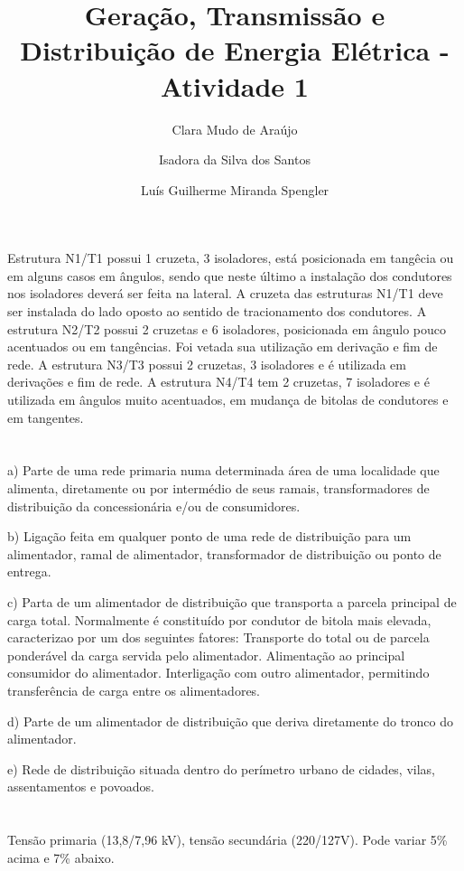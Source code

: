 \documentclass{article}
\title{Geração, Transmissão e Distribuição de Energia Elétrica - Atividade 1}
\date{}
\author[1]{Clara Mudo de Araújo}
\author[2]{Isadora da Silva dos Santos}
\author[3]{Luís Guilherme Miranda Spengler}
\affil[1,2,3]{Instituto Federal de Educação, Ciência e Tecnologia de Mato Grosso do Sul}
\begin{document}
\maketitle

\section{}
Estrutura N1/T1 possui 1 cruzeta, 3 isoladores, está posicionada em tangêcia ou em alguns casos em ângulos, sendo que neste último a instalação dos condutores nos isoladores deverá ser feita na lateral. A cruzeta das estruturas N1/T1 deve ser instalada do lado oposto ao sentido de tracionamento dos condutores. A estrutura N2/T2 possui 2 cruzetas e 6 isoladores, posicionada em ângulo pouco acentuados ou em tangências. Foi vetada sua utilização em derivação e fim de rede. A estrutura N3/T3 possui 2 cruzetas, 3 isoladores e é utilizada em derivações e fim de rede. A estrutura N4/T4 tem 2 cruzetas, 7 isoladores e é utilizada em ângulos muito acentuados, em mudança de bitolas de condutores e em tangentes.
\section{}
a) Parte de uma rede primaria numa determinada área de uma localidade que alimenta, diretamente ou por intermédio de seus ramais, transformadores de distribuição da concessionária e/ou de consumidores.

b) Ligação feita em qualquer ponto de uma rede de distribuição para um alimentador, ramal de alimentador, transformador de distribuição ou ponto de entrega.

c) Parta de um alimentador de distribuição que transporta a parcela principal de carga total. Normalmente é constituído por condutor de bitola mais elevada, caracterizao por um dos seguintes fatores: Transporte do total ou de parcela ponderável da carga servida pelo alimentador. Alimentação ao principal consumidor do alimentador. Interligação com outro alimentador, permitindo transferência de carga entre os alimentadores.

d) Parte de um alimentador de distribuição que deriva diretamente do tronco do alimentador.

e) Rede de distribuição situada dentro do perímetro urbano de cidades, vilas, assentamentos e povoados.
\section{}
Tensão primaria (13,8/7,96 kV), tensão secundária (220/127V). Pode variar 5\% acima e 7\% abaixo.
\end{document}
